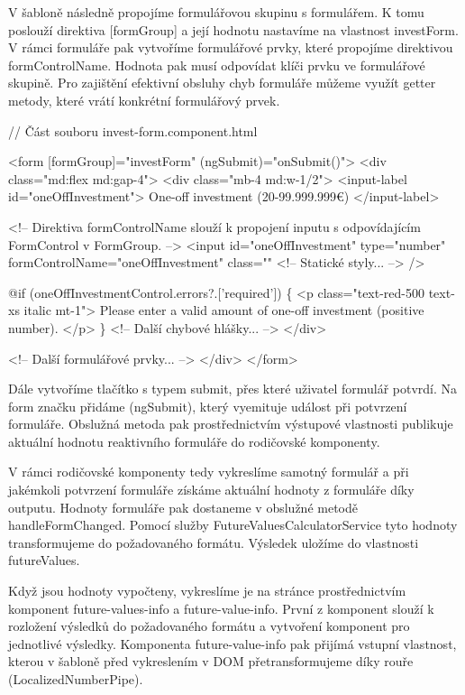V šabloně následně propojíme formulářovou skupinu s formulářem. K tomu poslouží direktiva [formGroup] a její hodnotu nastavíme na vlastnost investForm. 
V rámci formuláře pak vytvoříme formulářové prvky, které propojíme direktivou formControlName. Hodnota pak musí odpovídat klíči prvku ve formulářové skupině. 
Pro zajištění efektivní obsluhy chyb formuláře můžeme využít getter metody, které vrátí konkrétní formulářový prvek.

\begin{prog}
// Část souboru invest-form.component.html

<form [formGroup]="investForm" (ngSubmit)="onSubmit()">
  <div class="md:flex md:gap-4">
    <div class="mb-4 md:w-1/2">
      <input-label id="oneOffInvestment">
        One-off investment (20-99.999.999€)
      </input-label>

      <!-- Direktiva formControlName slouží k propojení inputu 
        s odpovídajícím FormControl v FormGroup. -->
      <input
        id="oneOffInvestment"
        type="number"
        formControlName="oneOffInvestment"
        class="" <!-- Statické styly... -->
      />

      @if (oneOffInvestmentControl.errors?.['required']) \{
        <p class="text-red-500 text-xs italic mt-1">
          Please enter a valid amount of one-off investment (positive number).
        </p>
      \}
      <!-- Další chybové hlášky... -->
    </div>

    <!-- Další formulářové prvky... -->
  </div>
</form>
\end{prog}

Dále vytvoříme tlačítko s typem submit, přes které uživatel formulář potvrdí. Na form značku přidáme (ngSubmit), který vyemituje událost při potvrzení formuláře. 
Obslužná metoda pak prostřednictvím výstupové vlastnosti publikuje aktuální hodnotu reaktivního formuláře do rodičovské komponenty.

V rámci rodičovské komponenty tedy vykreslíme samotný formulář a při jakémkoli potvrzení formuláře získáme aktuální hodnoty z formuláře díky outputu. 
Hodnoty formuláře pak dostaneme v obslužné metodě handleFormChanged. Pomocí služby FutureValuesCalculatorService tyto hodnoty transformujeme do požadovaného formátu. 
Výsledek uložíme do vlastnosti futureValues. 

Když jsou hodnoty vypočteny, vykreslíme je na stránce prostřednictvím komponent future-values-info a future-value-info. 
První z komponent slouží k rozložení výsledků do požadovaného formátu a vytvoření komponent pro jednotlivé výsledky. 
Komponenta future-value-info pak přijímá vstupní vlastnost, kterou v šabloně před vykreslením v DOM přetransformujeme díky rouře (LocalizedNumberPipe).

